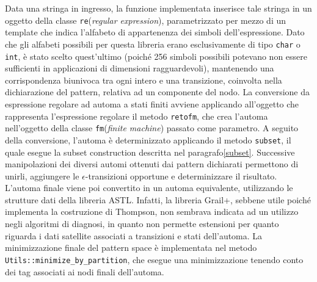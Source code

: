 Data una stringa in ingresso, la funzione implementata inserisce tale stringa in un oggetto della classe \verb|re|(\emph{regular expression}), parametrizzato per mezzo di un template che indica l'alfabeto di appartenenza dei simboli dell'espressione. 
Dato che gli alfabeti possibili per questa libreria erano esclusivamente di tipo \verb|char| o \verb|int|, è stato scelto quest'ultimo (poiché 256 simboli possibili potevano non essere sufficienti in applicazioni di dimensioni ragguardevoli), mantenendo una corrispondenza biunivoca tra ogni intero e una transizione, coinvolta nella dichiarazione del pattern, relativa ad un componente del nodo. La conversione da espressione regolare ad automa a stati finiti avviene applicando all'oggetto che rappresenta l'espressione regolare il metodo \verb|retofm|, che crea l'automa nell'oggetto della classe \verb|fm|(\emph{finite machine}) passato come parametro. A seguito della conversione, l'automa è determinizzato applicando il metodo \verb|subset|, il quale esegue la subset construction descritta nel paragrafo\ref{subset}.
Successive manipolazioni dei diversi automi ottenuti dai pattern dichiarati permettono di unirli, aggiungere le $\epsilon$-transizioni opportune e determinizzare il risultato. L'automa finale viene poi convertito in un automa equivalente, utilizzando le strutture dati della libreria ASTL. Infatti, la libreria Grail+, sebbene utile poiché implementa la costruzione di Thompson, non sembrava indicata ad un utilizzo negli algoritmi di diagnosi, in quanto non permette estensioni per quanto riguarda i dati satellite associati a transizioni e stati dell'automa.
La minimizzazione finale del pattern space è implementata nel metodo \verb|Utils::minimize_by_partition|, che esegue una minimizzazione tenendo conto dei tag associati ai nodi finali dell'automa.

